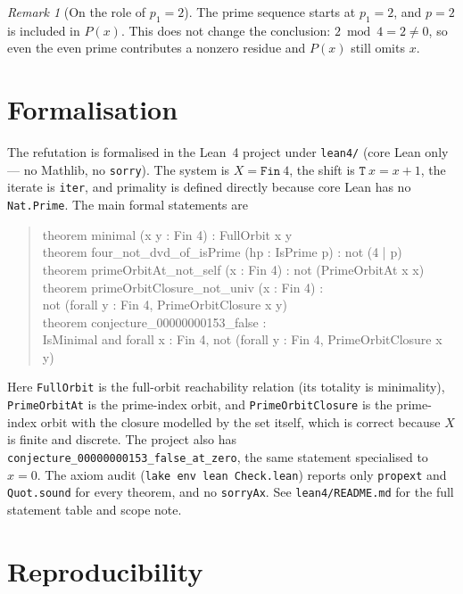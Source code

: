 \documentclass[11pt]{article}
\theoremstyle{definition}
\theoremstyle{remark}
\newtheorem{remark}[theorem]{Remark}
\begin{document}
\begin{remark}[On the role of $p_1 = 2$]
The prime sequence starts at $p_1 = 2$, and $p = 2$ is included in $P(x)$. This
does not change the conclusion: $2 \bmod 4 = 2 \neq 0$, so even the even prime
contributes a nonzero residue and $P(x)$ still omits $x$.
\end{remark}

\section{Formalisation}

The refutation is formalised in the Lean~4 project under \texttt{lean4/}
(core Lean only --- no Mathlib, no \texttt{sorry}). The system is
$X = \texttt{Fin}\ 4$, the shift is $\texttt{T}\ x = x+1$, the iterate is
\texttt{iter}, and primality is defined directly because core Lean has no
\texttt{Nat.Prime}. The main formal statements are

\begin{quote}\ttfamily
theorem minimal (x y : Fin 4) : FullOrbit x y\\
theorem four\_not\_dvd\_of\_isPrime (hp : IsPrime p) : not (4 | p)\\
theorem primeOrbitAt\_not\_self (x : Fin 4) : not (PrimeOrbitAt x x)\\
theorem primeOrbitClosure\_not\_univ (x : Fin 4) :\\
\hspace*{2em}not (forall y : Fin 4, PrimeOrbitClosure x y)\\
theorem conjecture\_00000000153\_false :\\
\hspace*{2em}IsMinimal and forall x : Fin 4, not (forall y : Fin 4, PrimeOrbitClosure x y)
\end{quote}

\noindent Here \texttt{FullOrbit} is the full-orbit reachability relation (its
totality is minimality), \texttt{PrimeOrbitAt} is the prime-index orbit, and
\texttt{PrimeOrbitClosure} is the prime-index orbit with the closure modelled
by the set itself, which is correct because $X$ is finite and discrete. The
project also has \texttt{conjecture\_00000000153\_false\_at\_zero}, the same
statement specialised to $x = 0$. The axiom audit
(\texttt{lake env lean Check.lean}) reports only \texttt{propext} and
\texttt{Quot.sound} for every theorem, and no \texttt{sorryAx}. See
\texttt{lean4/README.md} for the full statement table and scope note.

\section{Reproducibility}
\end{document}
